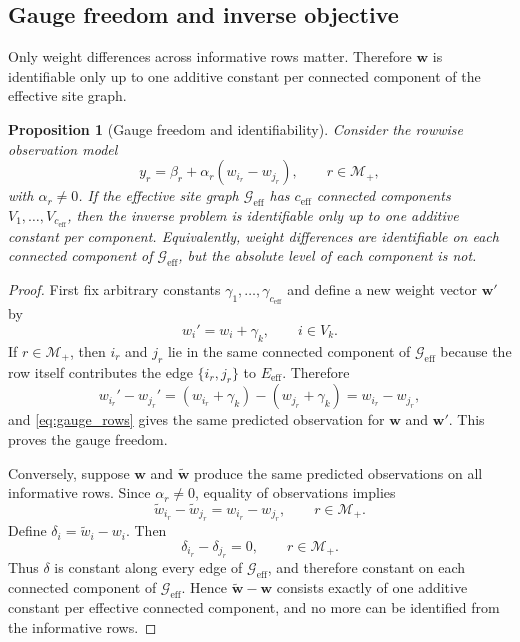 \documentclass[preprint,12pt]{elsarticle}
\newtheorem{proposition}{Proposition}
\newcommand{\weights}{\mathbf{w}}
\newcommand{\rowset}{\mathcal{M}}
\newcommand{\effgraph}{\mathcal{G}_{\mathrm{eff}}}
\begin{document}
\subsection{Gauge freedom and inverse objective}
Only weight differences across informative rows matter. Therefore $\weights$ is
identifiable only up to one additive constant per connected component of the
effective site graph.

\begin{proposition}[Gauge freedom and identifiability]
\label{prop:gauge}
Consider the rowwise observation model
\begin{equation}
    y_r=\beta_r+\alpha_r(w_{i_r}-w_{j_r}),
    \qquad r\in\rowset_+,
    \label{eq:gauge_rows}
\end{equation}
with $\alpha_r\neq 0$. If the effective site graph $\effgraph$ has
$c_{\mathrm{eff}}$ connected components $V_1,\dots,V_{c_{\mathrm{eff}}}$, then
the inverse problem is identifiable only up to one additive constant per
component. Equivalently, weight differences are identifiable on each connected
component of $\effgraph$, but the absolute level of each component is not.
\end{proposition}

\begin{proof}
First fix arbitrary constants $\gamma_1,\dots,\gamma_{c_{\mathrm{eff}}}$ and
define a new weight vector $\weights'$ by
\begin{equation}
    w_i' = w_i + \gamma_k, \qquad i\in V_k.
\end{equation}
If $r\in\rowset_+$, then $i_r$ and $j_r$ lie in the same connected component of
$\effgraph$ because the row itself contributes the edge $\{i_r,j_r\}$ to
$E_{\mathrm{eff}}$. Therefore
\begin{equation}
    w_{i_r}'-w_{j_r}' = (w_{i_r}+\gamma_k)-(w_{j_r}+\gamma_k)=w_{i_r}-w_{j_r},
\end{equation}
and \eqref{eq:gauge_rows} gives the same predicted observation for $\weights$
and $\weights'$. This proves the gauge freedom.

Conversely, suppose $\weights$ and $\widetilde{\weights}$ produce the same
predicted observations on all informative rows. Since $\alpha_r\neq 0$, equality
of observations implies
\begin{equation}
    \widetilde{w}_{i_r}-\widetilde{w}_{j_r}=w_{i_r}-w_{j_r},
    \qquad r\in\rowset_+.
\end{equation}
Define $\delta_i=\widetilde{w}_i-w_i$. Then
\begin{equation}
    \delta_{i_r}-\delta_{j_r}=0,
    \qquad r\in\rowset_+.
\end{equation}
Thus $\delta$ is constant along every edge of $\effgraph$, and therefore
constant on each connected component of $\effgraph$. Hence
$\widetilde{\weights}-\weights$ consists exactly of one additive constant per
effective connected component, and no more can be identified from the
informative rows.
\end{proof}
\end{document}
